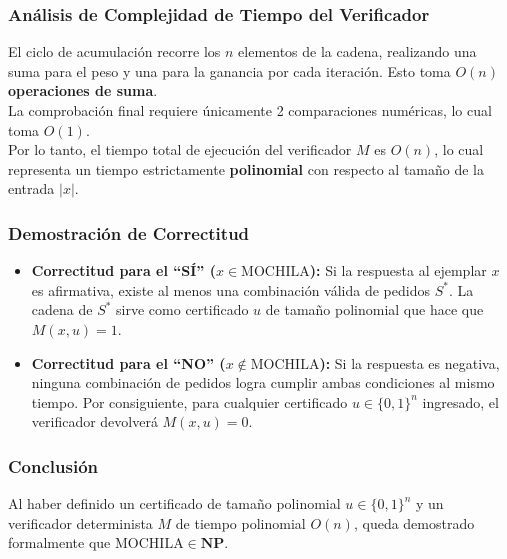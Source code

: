 \subsubsection*{Análisis de Complejidad de Tiempo del Verificador}

El ciclo de acumulación recorre los $n$ elementos de la cadena, realizando una suma para el peso y una para la ganancia por cada iteración. Esto toma \textbf{$O(n)$ operaciones de suma}.\\
La comprobación final requiere únicamente 2 comparaciones numéricas, lo cual toma \textbf{$O(1)$}.\\
Por lo tanto, el tiempo total de ejecución del verificador $M$ es \textbf{$O(n)$}, lo cual representa un tiempo estrictamente \textbf{polinomial} con respecto al tamaño de la entrada $|x|$.

\subsubsection*{Demostración de Correctitud}

\begin{itemize}[leftmargin=*]
    \item \textbf{Correctitud para el ``SÍ'' ($x \in \text{MOCHILA}$):} Si la respuesta al ejemplar $x$ es afirmativa, existe al menos una combinación válida de pedidos $S^*$. La cadena de $S^*$ sirve como certificado $u$ de tamaño polinomial que hace que $M(x, u) = 1$.
    \item \textbf{Correctitud para el ``NO'' ($x \notin \text{MOCHILA}$):} Si la respuesta es negativa, ninguna combinación de pedidos logra cumplir ambas condiciones al mismo tiempo. Por consiguiente, para cualquier certificado $u \in \{0, 1\}^n$ ingresado, el verificador devolverá $M(x, u) = 0$.
\end{itemize}

\subsubsection*{Conclusión}

Al haber definido un certificado de tamaño polinomial $u \in \{0, 1\}^n$ y un verificador determinista $M$ de tiempo polinomial $O(n)$, queda demostrado formalmente que \textbf{$\text{MOCHILA} \in \mathbf{NP}$}.